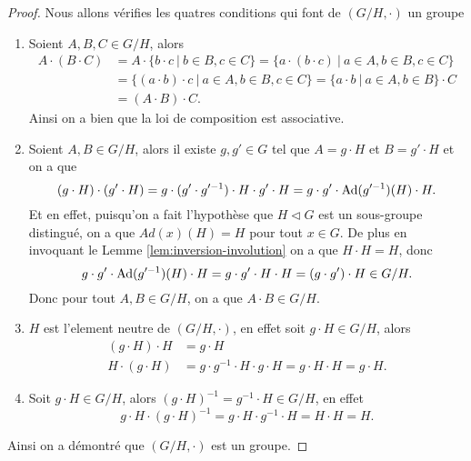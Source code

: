 \begin{proof}
	Nous allons vérifies les quatres conditions qui font de $(G/H, \cdot)$ un groupe
	\begin{enumerate}
		\item Soient $A, B, C \in G/H$, alors
			\begin{align*}
				A \cdot (B \cdot C) &= A \cdot \{b \cdot c\ |\ b \in B, c \in C\}
					= \{a \cdot (b \cdot c)\ |\ a \in A, b \in B, c \in C\}\\
				&= \{(a \cdot b) \cdot c\ |\ a \in A, b \in B, c \in C\}
					= \{a \cdot b\ |\ a \in A, b \in B\} \cdot C\\
				&= (A \cdot B) \cdot C.
			\end{align*}
			Ainsi on a bien que la loi de composition est associative.
		\item Soient $A, B \in G/H$, alors il existe $g, g' \in G$
			tel que $A = g \cdot H$ et
			$B = g' \cdot H$ et on a que	
			\begin{equation*}
				(g \cdot H) \cdot (g' \cdot H)
				= g \cdot (g' \cdot g'^{-1}) \cdot H \cdot g' \cdot H
				= g \cdot g' \cdot \operatorname{Ad}(g'^{-1})(H) \cdot H.
			\end{equation*}
			Et en effet, puisqu'on a fait l'hypothèse que $H \triangleleft G$
			est un sous-groupe distingué,
			on a que ${Ad(x)(H) = H}$ pour tout $x \in G$.
			De plus en invoquant le Lemme \ref{lem:inversion-involution} on a
			que $H \cdot H = H$, donc
			\begin{equation*}
				g \cdot g' \cdot \operatorname{Ad}(g'^{-1})(H) \cdot H = g \cdot g' \cdot H \cdot H
				= (g \cdot g') \cdot H \in G/H.
			\end{equation*}
			Donc pour tout $A, B \in G/H$, on a que $A \cdot B \in G/H$.
		\item $H$ est l'element neutre de $(G/H, \cdot)$,
			en effet soit $g \cdot H \in G/H$, alors 
			\begin{align*}
				(g \cdot H) \cdot H &= g \cdot H\\
				H \cdot (g \cdot H) &= g \cdot g^{-1} \cdot H \cdot g \cdot H
				= g \cdot H \cdot H = g \cdot H.
			\end{align*}
		\item Soit $g \cdot H \in G/H$, alors $(g \cdot H)^{-1} = g^{-1} \cdot H \in G/H$,
			en effet
			\begin{equation*}
				g \cdot H \cdot (g \cdot H)^{-1} = g \cdot H \cdot g^{-1} \cdot H
				= H \cdot H = H.
			\end{equation*}
	\end{enumerate}
	Ainsi on a démontré que $(G/H, \cdot)$ est un groupe.
\end{proof}

